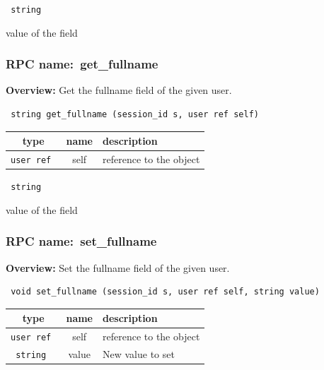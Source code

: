 \vspace{0.3cm}

{\tt 
string
}


value of the field
\vspace{0.3cm}
\vspace{0.3cm}
\vspace{0.3cm}
\subsubsection{RPC name:~get\_fullname}

{\bf Overview:} 
Get the fullname field of the given user.

\begin{verbatim} string get_fullname (session_id s, user ref self)\end{verbatim}



 
\vspace{0.3cm}
\begin{tabular}{|c|c|p{7cm}|}
 \hline
{\bf type} & {\bf name} & {\bf description} \\ \hline
{\tt user ref } & self & reference to the object \\ \hline 

\end{tabular}

\vspace{0.3cm}

{\tt 
string
}


value of the field
\vspace{0.3cm}
\vspace{0.3cm}
\vspace{0.3cm}
\subsubsection{RPC name:~set\_fullname}

{\bf Overview:} 
Set the fullname field of the given user.

\begin{verbatim} void set_fullname (session_id s, user ref self, string value)\end{verbatim}



 
\vspace{0.3cm}
\begin{tabular}{|c|c|p{7cm}|}
 \hline
{\bf type} & {\bf name} & {\bf description} \\ \hline
{\tt user ref } & self & reference to the object \\ \hline 

{\tt string } & value & New value to set \\ \hline 

\end{tabular}

